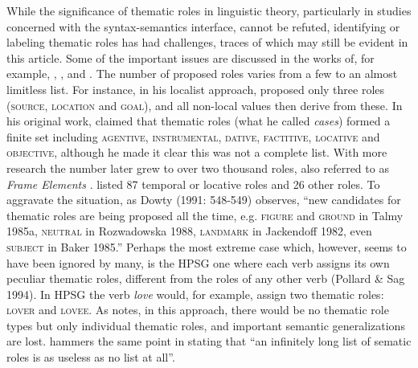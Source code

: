 \documentclass[output=paper]{langsci/langscibook}
\begin{document}
While the significance of thematic roles in linguistic theory, particularly in studies concerned with the syntax-semantics interface, cannot be refuted, identifying or labeling thematic roles has had challenges, traces of which may still be evident in this article. Some of the important issues are discussed in the works of, for example, \citet{Dowty1991}, \citet{Jackendoff1987}, \citet[689]{Newmeyer2010} and \citet[6]{KittilaEtAl2011}. The number of proposed roles varies from a few to an almost limitless list. For instance, in his localist approach, \citet{Anderson1971} proposed only three roles (\textsc{source, location} and \textsc{goal}), and all non-local values then derive from these. In his original work, \citet{Fillmore1968} claimed that thematic roles (what he called \textit{cases}) formed a finite set including \textsc{agentive, instrumental, dative, factitive, locative} and \textsc{objective,} although he made it clear this was not a complete list. With more research the number later grew to over two thousand roles, also referred to as \textit{Frame Elements} \citep{Fillmore1985}. \citet{Blake1930} listed 87 temporal or locative roles and 26 other roles. To aggravate the situation, as Dowty\textit{ }(1991: 548-549) observes, “new candidates for thematic roles are being proposed all the time, e.g. \textsc{figure} and \textsc{ground} in Talmy 1985a, \textsc{neutral} in Rozwadowska 1988, \textsc{landmark} in Jackendoff 1982, even \textsc{subject} in Baker 1985.” Perhaps the most extreme case which, however, seems to have been ignored by many, is the HPSG one where each verb assigns its own peculiar thematic roles, different from the roles of any other verb (Pollard \& Sag 1994). In HPSG the verb \textit{love} would, for example, assign two thematic roles: \textsc{lover} and \textsc{lovee}. As \citet{Dowty1989} notes, in this approach, there would be no thematic role types but only individual thematic roles, and important semantic generalizations are lost. \citet[52]{Payne1997} hammers the same point in stating that “an infinitely long list of sematic roles is as useless as no list at all”.
\end{document}
